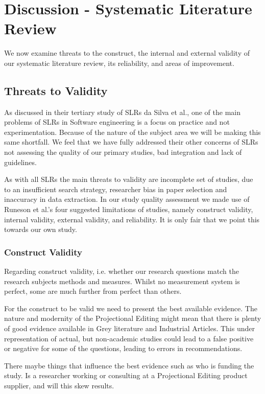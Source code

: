 \section{Discussion - Systematic Literature Review}
We now examine threats to the construct, the internal and external validity of our systematic literature review, its reliability, and areas of improvement.

\subsection{Threats to Validity}  
As discussed in their tertiary study of SLRs da Silva et al.\cite{DaSilvaFabioQ.B2011Syos}, one of the main problems of SLRs in Software engineering is a focus on practice and not experimentation.
Because of the nature of the subject area we will be making this same shortfall. 
We feel that we have fully addressed their other concerns of SLRs not assessing the quality of our primary studies, bad integration and lack of guidelines.

As with all SLRs the main threats to validity are incomplete set of studies, due to an insufficient search strategy, researcher bias in paper selection and inaccuracy in data extraction.
In our study quality assessment we made use of Runeson et al.'s\cite{runeson2009guidelines} four suggested limitations of studies, namely construct validity, internal validity, external validity, and reliability.
It is only fair that we point this towards our own study.

\subsubsection{Construct Validity}
Regarding construct validity, i.e. whether our research questions match the research subjects methods and measures.
Whilst no measurement system is perfect, some are much further from perfect than others.

For the construct to be valid we need to present the best available evidence.
The nature and modernity of the Projectional Editing might mean that there is plenty of good evidence available in Grey literature and Industrial Articles. 
This under representation of actual, but non-academic studies could lead to a false positive or negative for some of the questions, leading to errors in recommendations.

There maybe things that influence the best evidence such as who is funding the study. 
Is a researcher working or consulting at a Projectional Editing product supplier, and will this skew results.

